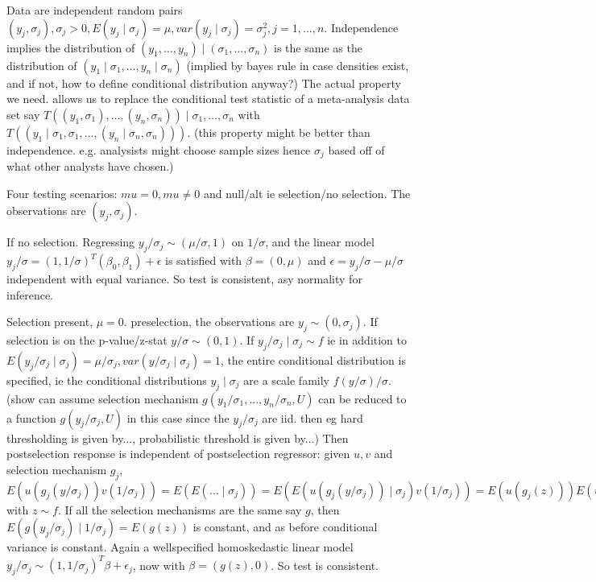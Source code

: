 \documentclass{article}
\begin{document}
Data are independent random pairs
$(y_j,\sigma_j),\sigma_j>0,E(y_j\mid\sigma_j)=\mu,
var(y_j\mid\sigma_j)=\sigma_j^2, j=1,\ldots,n$. Independence implies
the distribution of $(y_1,\ldots,y_n)\mid (\sigma_1,\ldots,\sigma_n)$
is the same as the distribution of
$(y_1\mid\sigma_1,\ldots,y_n\mid\sigma_n)$ (implied by bayes rule in
case densities exist, and if not, how to define conditional
distribution anyway?) The actual property we need. allows us to
replace the conditional test statistic of a meta-analysis data set say
$T((y_1,\sigma_1),\ldots,(y_n,\sigma_n))\mid\sigma_1,\ldots,\sigma_n$
with
$T((y_1\mid\sigma_1,\sigma_1,\ldots,(y_n\mid\sigma_n,\sigma_n)))$. (this
property might be better than independence. e.g. analysists might
choose sample sizes hence $\sigma_j$ based off of what other analysts
have chosen.)


Four testing scenarios: $mu=0,mu\neq 0$ and null/alt ie selection/no
selection. The observations are $(y_j,\sigma_j)$.

If no selection. Regressing $y_j/\sigma_j\sim (\mu/\sigma,1)$ on
$1/\sigma$, and the linear model
$y_j/\sigma = (1,1/\sigma)^T(\beta_0,\beta_1)+\epsilon$ is satisfied
with $\beta=(0,\mu)$ and $\epsilon=y_j/\sigma-\mu/\sigma$ independent
with equal variance. So test is consistent, asy normality for inference.

Selection present, $\mu=0$. preselection, the observations are
$y_j\sim (0,\sigma_j)$. If selection is on the p-value/z-stat
$y/\sigma\sim (0,1)$. If $y_j/\sigma_j\mid\sigma_j \sim f$ ie in
addition to
$E(y_j/\sigma_j\mid\sigma_j)=\mu/\sigma_j,var(y/\sigma_j\mid\sigma_j)=1$,
the entire conditional distribution is specified, ie the conditional
distributions $y_j\mid\sigma_j$ are a scale family
$f(y/\sigma)/\sigma$. (show can assume selection mechanism
$g(y_1/\sigma_1,\ldots,y_n/\sigma_n,U)$ can be reduced to a function
$g(y_j/\sigma_j,U)$ in this case since the $y_j/\sigma_j$ are
iid. then eg hard thresholding is given by..., probabilistic threshold
is given by...) Then postselection response is independent of
postselection regressor: given $u,v$ and selection mechanism $g_j$,
$E(u(g_j(y/\sigma_j))v(1/\sigma_j))=E(E(\ldots\mid\sigma_j))=E(E(u(g_j(y/\sigma_j))\mid\sigma_j)v(1/\sigma_j))=E(u(g_j(z)))E(v(1/\sigma_j))$
with $z\sim f$.
If all the selection mechanisms are the same say $g$, then
$E(g(y_j/\sigma_j)\mid1/\sigma_j)=E(g(z))$ is constant, and as before
conditional variance is constant. Again a wellspecified homoskedastic
linear model $y_j/\sigma_j \sim (1,1/\sigma_j)^T\beta+\epsilon_j$, now
with $\beta=(g(z),0)$. So test is consistent.
\end{document}
